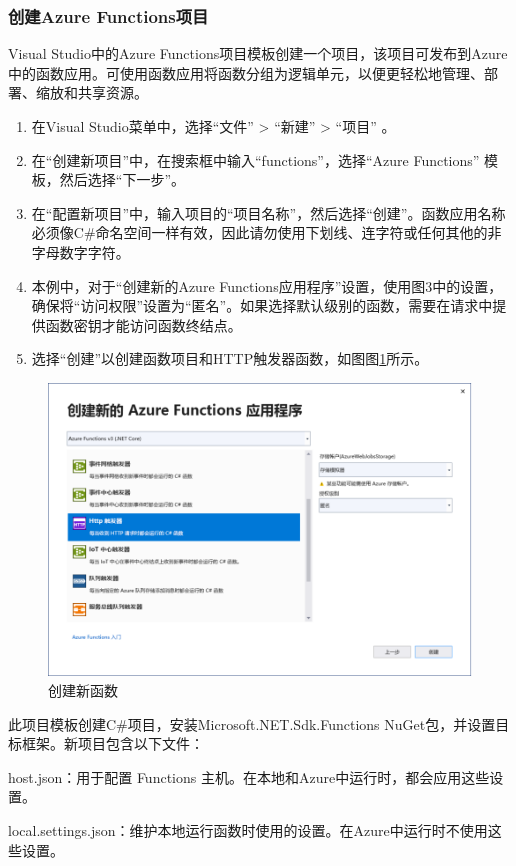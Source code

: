 \documentclass[11pt]{article}
\begin{document}
\subsubsection{创建Azure Functions项目} 
Visual Studio中的Azure Functions项目模板创建一个项目，该项目可发布到Azure中的函数应用。可使用函数应用将函数分组为逻辑单元，以便更轻松地管理、部署、缩放和共享资源。
\begin{enumerate}
	\item 在Visual Studio菜单中，选择“文件” > “新建” > “项目” 。
	\item 在“创建新项目”中，在搜索框中输入“functions”，选择“Azure Functions” 模板，然后选择“下一步”。
	\item 在“配置新项目”中，输入项目的“项目名称”，然后选择“创建”。函数应用名称必须像C\#命名空间一样有效，因此请勿使用下划线、连字符或任何其他的非字母数字字符。
	\item 本例中，对于“创建新的Azure Functions应用程序”设置，使用图3中的设置，确保将“访问权限”设置为“匿名”。如果选择默认级别的函数，需要在请求中提供函数密钥才能访问函数终结点。
	\item 选择“创建”以创建函数项目和HTTP触发器函数，如图图\ref{fig3}所示。
\end{enumerate}
\begin{figure}[h]	
	\centering
	\includegraphics[scale=0.6]{figs/3.png}        %
	\caption{创建新函数}
	\label{fig3}	
\end{figure}
此项目模板创建C\#项目，安装Microsoft.NET.Sdk.Functions NuGet包，并设置目标框架。新项目包含以下文件：

host.json：用于配置 Functions 主机。在本地和Azure中运行时，都会应用这些设置。 

local.settings.json：维护本地运行函数时使用的设置。在Azure中运行时不使用这些设置。
\end{document}
